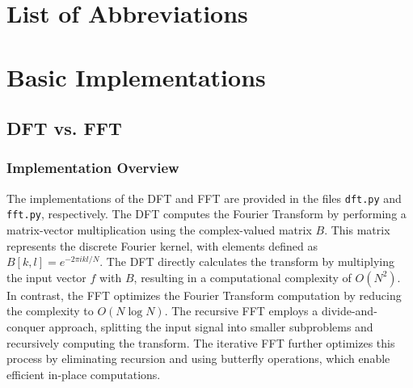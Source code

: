 \documentclass[12pt, a4paper]{report}
\begin{document}



\renewcommand{\contentsname}{Table of Contents}
\tableofcontents %
\newpage


\chapter*{List of Abbreviations}
\label{sec:abkuerzungsverzeichnis}
\begin{acronym}[OpenCV]
\end{acronym}
\newpage

\renewcommand{\listfigurename}{List of Figures}
\listoffigures
\newpage



\setcounter{page}{1}	%

\chapter{Basic Implementations}

\section{\ac{DFT} vs. \ac{FFT}}

\subsection{Implementation Overview}
The implementations of the \ac{DFT} and \ac{FFT} are provided in the files \texttt{dft.py} and \texttt{fft.py}, respectively. The \ac{DFT} computes the Fourier Transform by performing a matrix-vector multiplication using the complex-valued matrix \( B \). This matrix represents the discrete Fourier kernel, with elements defined as \( B[k, l] = e^{-2\pi i k l / N} \). The \ac{DFT} directly calculates the transform by multiplying the input vector \( f \) with \( B \), resulting in a computational complexity of \(O(N^2)\).\\
In contrast, the FFT optimizes the Fourier Transform computation by reducing the complexity to \(O(N \log N)\). The recursive FFT employs a divide-and-conquer approach, splitting the input signal into smaller subproblems and recursively computing the transform. The iterative FFT further optimizes this process by eliminating recursion and using butterfly operations, which enable efficient in-place computations.
\end{document}
